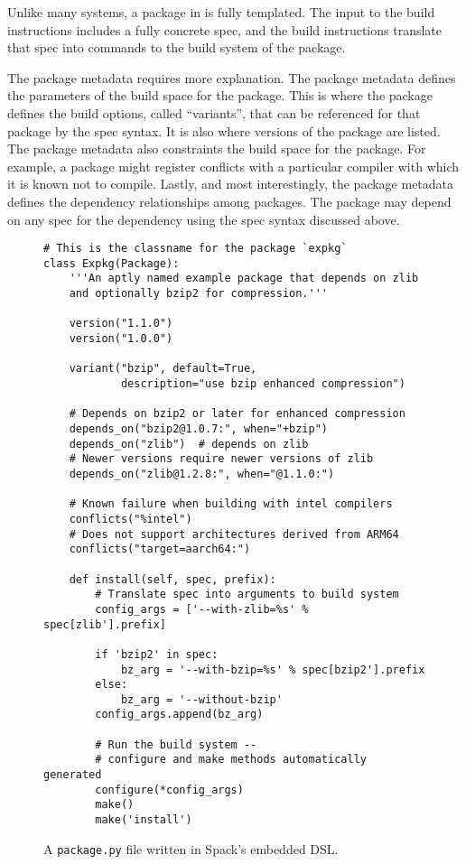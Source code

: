 Unlike many systems, a package in \spack{} is fully templated. The input to the build instructions includes a fully concrete spec, and the build instructions translate that spec into commands to the build system of the package.

The package metadata requires more explanation. The package metadata defines the parameters of the build space for the package. This is where the package defines the build options, called ``variants'', that can be referenced for that package by the spec syntax. It is also where versions of the package are listed. The package metadata also constraints the build space for the package. For example, a package might register conflicts with a particular compiler with which it is known not to compile. Lastly, and most interestingly, the package metadata defines the dependency relationships among packages. The package may depend on any spec for the dependency using the spec syntax discussed above.

\begin{figure}
\begin{verbatim}
# This is the classname for the package `expkg`
class Expkg(Package):
    '''An aptly named example package that depends on zlib
    and optionally bzip2 for compression.'''

    version("1.1.0")
    version("1.0.0")

    variant("bzip", default=True,
            description="use bzip enhanced compression")

    # Depends on bzip2 or later for enhanced compression
    depends_on("bzip2@1.0.7:", when="+bzip")
    depends_on("zlib")  # depends on zlib
    # Newer versions require newer versions of zlib
    depends_on("zlib@1.2.8:", when="@1.1.0:")

    # Known failure when building with intel compilers
    conflicts("%intel")
    # Does not support architectures derived from ARM64
    conflicts("target=aarch64:")

    def install(self, spec, prefix):
        # Translate spec into arguments to build system
        config_args = ['--with-zlib=%s' % spec[zlib'].prefix]

        if 'bzip2' in spec:
            bz_arg = '--with-bzip=%s' % spec[bzip2'].prefix
        else:
            bz_arg = '--without-bzip'
        config_args.append(bz_arg)

        # Run the build system --
        # configure and make methods automatically generated
        configure(*config_args)
        make()
        make('install')
\end{verbatim}
\caption{
  A {\tt package.py} file written in Spack's embedded DSL.
  \label{fig:example-spack-package}
}
\end{figure}

